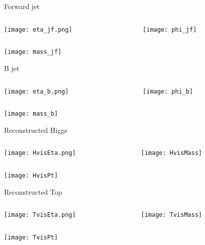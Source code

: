 \begin{frame}{Forward jet}
    \begin{columns}
        \begin{column}{0.5\textwidth}
            \texttt{[image: eta\_jf.png]}
        \end{column}
        \begin{column}{0.5\textwidth}
            \texttt{[image: phi\_jf]}
        \end{column}
    \end{columns}
            \centering \texttt{[image: mass\_jf]}
\end{frame}

\begin{frame}{B jet}
    \begin{columns}
        \begin{column}{0.5\textwidth}
            \texttt{[image: eta\_b.png]}
        \end{column}
        \begin{column}{0.5\textwidth}
            \texttt{[image: phi\_b]}
        \end{column}
    \end{columns}
            \centering \texttt{[image: mass\_b]}
\end{frame}

\begin{frame}{Reconstructed Higgs}
    \begin{columns}
        \begin{column}{0.5\textwidth}
            \texttt{[image: HvisEta.png]}
        \end{column}
        \begin{column}{0.5\textwidth}
            \texttt{[image: HvisMass]}
        \end{column}
    \end{columns}
            \centering \texttt{[image: HvisPt]}
\end{frame}

\begin{frame}{Reconstructed Top}
    \begin{columns}
        \begin{column}{0.5\textwidth}
            \texttt{[image: TvisEta.png]}
        \end{column}
        \begin{column}{0.5\textwidth}
            \texttt{[image: TvisMass]}
        \end{column}
    \end{columns}
            \centering \texttt{[image: TvisPt]}
\end{frame}